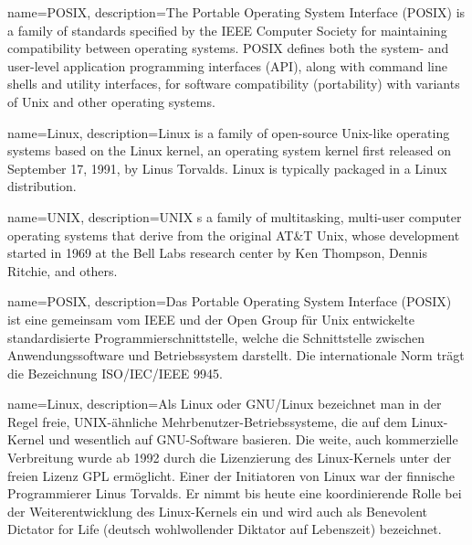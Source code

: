 	

\fi

\ifenglish%
	{%
		name={POSIX},
		description={The Portable Operating System Interface (POSIX) is a family of standards specified by the IEEE Computer Society for maintaining compatibility between operating systems. POSIX defines both the system- and user-level application programming interfaces (API), along with command line shells and utility interfaces, for software compatibility (portability) with variants of Unix and other operating systems.}
	}

	{%
		name={Linux},
		description={Linux is a family of open-source Unix-like operating systems based on the Linux kernel, an operating system kernel first released on September 17, 1991, by Linus Torvalds. Linux is typically packaged in a Linux distribution.}
	}

	{%
		name={UNIX},
		description={UNIX s a family of multitasking, multi-user computer operating systems that derive from the original AT&T Unix, whose development started in 1969 at the Bell Labs research center by Ken Thompson, Dennis Ritchie, and others.}
	}

\else

	{%
		name={POSIX},
		description={Das Portable Operating System Interface (POSIX) ist eine gemeinsam vom IEEE und der Open Group für Unix entwickelte standardisierte Programmierschnittstelle, welche die Schnittstelle zwischen Anwendungssoftware und Betriebssystem darstellt. Die internationale Norm trägt die Bezeichnung ISO/IEC/IEEE 9945. }
	}

	{%
		name={Linux},
		description={Als Linux oder GNU/Linux bezeichnet man in der Regel freie, UNIX-ähnliche Mehrbenutzer-Betriebssysteme, die auf dem Linux-Kernel und wesentlich auf GNU-Software basieren. Die weite, auch kommerzielle Verbreitung wurde ab 1992 durch die Lizenzierung des Linux-Kernels unter der freien Lizenz GPL ermöglicht. Einer der Initiatoren von Linux war der finnische Programmierer Linus Torvalds. Er nimmt bis heute eine koordinierende Rolle bei der Weiterentwicklung des Linux-Kernels ein und wird auch als Benevolent Dictator for Life (deutsch wohlwollender Diktator auf Lebenszeit) bezeichnet.}
	}

